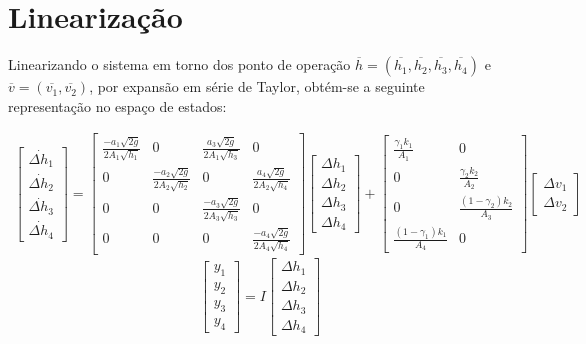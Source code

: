 \section{Linearização}
Linearizando o sistema em torno dos ponto de operação $\overline{h}=(\overline{h_{1}},\overline{h_{2}},\overline{h_{3}},\overline{h_{4}})$ e $\overline{v}=(\overline{v_{1}},\overline{v_{2}})$, por expansão em série de Taylor, obtém-se a seguinte representação no espaço de estados:

\begin{multline}
	\begin{bmatrix}
		\dot{\Delta h_{1}} \\
		\dot{\Delta h_{2}} \\
		\dot{\Delta h_{3}} \\
		\dot{\Delta h_{4}} 
	\end{bmatrix}
	= 
	\begin{bmatrix}
		\frac{-a_{1}\sqrt{2g}}{2A_{1}\sqrt{h_{1}}} & 0 & \frac{a_{3}\sqrt{2g}}{2A_{1}\sqrt{h_{3}}} & 0 \\
		0 & \frac{-a_{2}\sqrt{2g}}{2A_{2}\sqrt{h_{2}}} & 0 & \frac{a_{4}\sqrt{2g}}{2A_{2}\sqrt{h_{4}}} \\
		0 & 0 & \frac{-a_{3}\sqrt{2g}}{2A_{3}\sqrt{h_{3}}} & 0 \\
		0 & 0 & 0 & \frac{-a_{4}\sqrt{2g}}{2A_{4}\sqrt{h_{4}}}
	\end{bmatrix}
	\begin{bmatrix}
		\Delta h_{1} \\
		\Delta h_{2} \\
		\Delta h_{3} \\
		\Delta h_{4} 
	\end{bmatrix}
	+
	\begin{bmatrix}
		\frac{\gamma_{1}k_{1}}{A_{1}} & 0 \\
		0 & \frac{\gamma_{2}k_{2}}{A_{2}} \\
		0 & \frac{(1-\gamma_{2}) k_{2}}{A_{3}} \\
		\frac{(1-\gamma_{1})k_{1}}{A_{4}} & 0
	\end{bmatrix}
	\begin{bmatrix}
		\Delta v_{1} \\
		\Delta v_{2}
	\end{bmatrix}
	\label{eq2}
\end{multline}
\begin{equation}
	\begin{bmatrix}
		y_{1} \\
		y_{2} \\
		y_{3} \\
		y_{4} 
	\end{bmatrix}
	= 
	I
	\begin{bmatrix}
		\Delta h_{1} \\
		\Delta h_{2} \\
		\Delta h_{3} \\
		\Delta h_{4} 
	\end{bmatrix}
	\label{eq3}
\end{equation}

